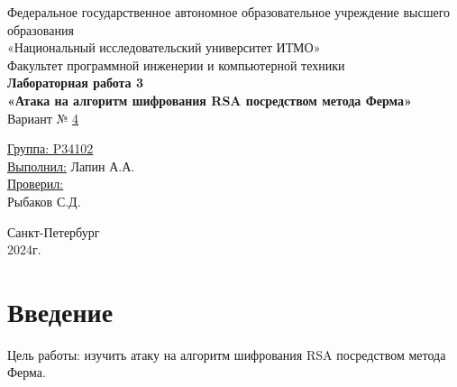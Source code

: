 \documentclass[a4paper, 14pt]{report}
\begin{document}
\begin{titlepage}
    \centering
    {\large Федеральное государственное автономное образовательное учреждение высшего образования}\\
    {\large «Национальный исследовательский университет ИТМО»}\\[0.5cm]

    {\large Факультет программной инженерии и компьютерной техники}\\[3cm]

    {\large \bfseries Лабораторная работа 3}\\[0.5cm]
    {\large \bfseries «Атака на алгоритм шифрования RSA посредством метода Ферма»}\\[1cm]

    {\large Вариант № \underline{4}}\\[5cm]
    \begin{flushright}
        {\large \underline{Группа: P34102}}\\[0.5cm]
        {\large \underline{Выполнил:} Лапин А.А.}\\[1cm]

        {\large \underline{Проверил:}}\\
        {\large Рыбаков С.Д.}\\[9cm]
    \end{flushright}

    {\large Санкт-Петербург}\\
    {\large 2024г.}
\end{titlepage}

\setcounter{page}{2}
\tableofcontents
\newpage

\chapter*{Введение}
{}
Цель работы: изучить атаку на алгоритм шифрования RSA посредством метода Ферма.
\end{document}
